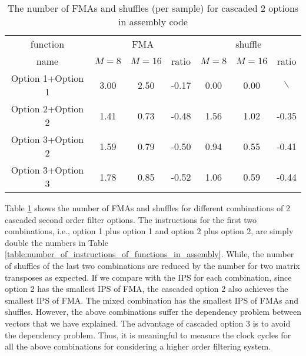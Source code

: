 \begin{table}[t]
    \caption{The number of FMAs and shuffles (per sample) for cascaded 2 options in assembly code}  %
    \centering %
    \setlength{\tabcolsep}{1.6pt}
    \begin{tabular}{c|c|c|c|c|c|c} %
    \hline\hline %
    function & \multicolumn{3}{c|}{FMA} & \multicolumn{3}{c}{shuffle} \\ [0.4ex]
    \cline{2-7}
    name & $M{=}8$ & $M{=}16$ & ratio & $M{=}8$ & $M{=}16$ & ratio \\ [0.4ex] %
    \hline
    Option 1+Option 1 & 3.00 & 2.50 & -0.17 & 0.00 & 0.00 & $\backslash$ \\ [0.4ex]
    Option 2+Option 2 & 1.41 & 0.73 & -0.48 & 1.56 & 1.02 & -0.35 \\ [0.4ex]
    Option 3+Option 2 & 1.59 & 0.79 & -0.50 & 0.94 & 0.55 & -0.41 \\ [0.4ex]
    Option 3+Option 3 & 1.78 & 0.85 & -0.52 & 1.06 & 0.59 & -0.44 \\ [1ex]
    \hline
    \end{tabular}
    \label{table:number_of_instructions_of_cascaded2_in_assembly} %
\end{table}

Table \ref{table:number_of_instructions_of_cascaded2_in_assembly} shows the number of FMAs and shuffles
for diff\-erent combinations of 2 cascaded second order filter options.
The instructions for the first two combinations, i.e., option 1 plus option 1 and option 2 plus option 2,
are simply double the numbers in Table \ref{table:number_of_instructions_of_functions_in_assembly}.
While, the number of shuffles of the last two combinations are reduced by the number for two matrix transposes as expected.
If we compare with the IPS for each combination,
since option 2 has the smallest IPS of FMA, 
the cascaded option 2 also achieves the smallest IPS of FMA. The mixed
combination has the smallest IPS of FMAs and shuffles.
However, the above combinations suffer the dependency probl\-em
between vectors that we have explained.
The advantage of cascaded option 3 is to avoid the dependency problem.
Thus, it is meaningful to measure the clock cycles for all the above combinations
for considering a higher order filtering system. 

